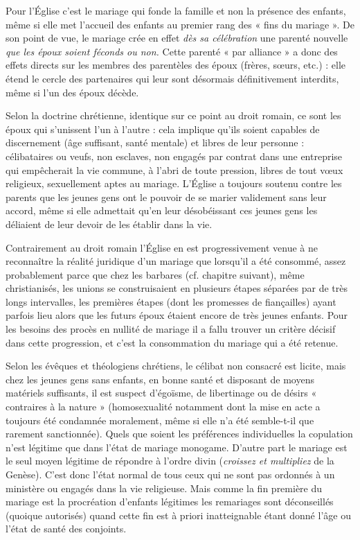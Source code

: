  Pour l'Église c'est le mariage qui fonde la famille et non la présence des enfants, même si elle met l'accueil des enfants au premier rang des « fins du mariage ». De son point de vue, le mariage crée en effet \emph{dès sa célébration} une parenté nouvelle \emph{que les époux soient féconds ou non.} Cette parenté « par alliance » a donc des effets directs sur les membres des parentèles des époux (frères, sœurs, etc.) : elle étend le cercle des partenaires qui leur sont désormais définitivement interdits, même si l'un des époux décède.

 Selon la doctrine chrétienne, identique sur ce point au droit romain, ce sont les époux qui s'unissent l'un à l'autre : cela implique qu'ils soient capables de discernement (âge suffisant, santé mentale) et libres de leur personne : célibataires ou veufs, non esclaves, non engagés par contrat dans une entreprise qui empêcherait la vie commune, à l'abri de toute pression, libres de tout vœux religieux, sexuellement aptes au mariage. L'Église a toujours soutenu contre les parents que les jeunes gens ont le pouvoir de se marier validement sans leur accord, même si elle admettait qu'en leur désobéissant ces jeunes gens les déliaient de leur devoir de les établir dans la vie. 

 Contrairement au droit romain l'Église en est progressivement venue à ne reconnaître la réalité juridique d'un mariage que lorsqu'il a été consommé, assez probablement parce que chez les barbares (cf. chapitre suivant), même christianisés, les unions se construisaient en plusieurs étapes séparées par de très longs intervalles, les premières étapes (dont les promesses de fiançailles) ayant parfois lieu alors que les futurs époux étaient encore de très jeunes enfants. Pour les besoins des procès en nullité de mariage il a fallu trouver un critère décisif dans cette progression, et c'est la consommation du mariage qui a été retenue. 

 Selon les évêques et théologiens chrétiens, le célibat non consacré est licite, mais chez les jeunes gens sans enfants, en bonne santé et disposant de moyens matériels suffisants, il est suspect d'égoïsme, de libertinage ou de désirs « contraires à la nature » (homosexualité notamment dont la mise en acte a toujours été condamnée moralement, même si elle n'a été semble-t-il que rarement sanctionnée). Quels que soient les préférences individuelles la copulation n'est légitime que dans l'état de mariage monogame. D'autre part le mariage est le seul moyen légitime de répondre à l'ordre divin (\emph{croissez et multipliez} de la Genèse). C'est donc l'état normal de tous ceux qui ne sont pas ordonnés à un ministère ou engagés dans la vie religieuse. Mais comme la fin première du mariage est la procréation d'enfants légitimes les remariages sont déconseillés (quoique autorisés) quand cette fin est à priori inatteignable étant donné l'âge ou l'état de santé des conjoints. 

